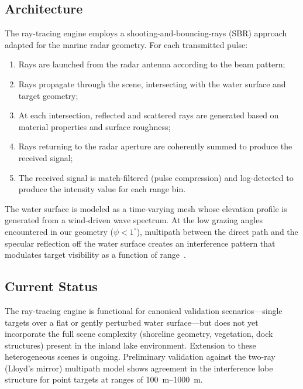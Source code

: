 \documentclass[twocolumn, 10pt]{article}
\begin{document}
\subsection{Architecture}

The ray-tracing engine employs a shooting-and-bouncing-rays (SBR) approach~\cite{ling1989shooting} adapted for the marine radar geometry. For each transmitted pulse:
\begin{enumerate}
    \item Rays are launched from the radar antenna according to the beam pattern;
    \item Rays propagate through the scene, intersecting with the water surface and target geometry;
    \item At each intersection, reflected and scattered rays are generated based on material properties and surface roughness;
    \item Rays returning to the radar aperture are coherently summed to produce the received signal;
    \item The received signal is match-filtered (pulse compression) and log-detected to produce the intensity value for each range bin.
\end{enumerate}

The water surface is modeled as a time-varying mesh whose elevation profile is generated from a wind-driven wave spectrum. At the low grazing angles encountered in our geometry ($\psi < 1^{\circ}$), multipath between the direct path and the specular reflection off the water surface creates an interference pattern that modulates target visibility as a function of range~\cite{long2001radar, blake1986radar}.

\subsection{Current Status}

The ray-tracing engine is functional for canonical validation scenarios---single targets over a flat or gently perturbed water surface---but does not yet incorporate the full scene complexity (shoreline geometry, vegetation, dock structures) present in the inland lake environment. Extension to these heterogeneous scenes is ongoing. Preliminary validation against the two-ray (Lloyd's mirror) multipath model shows agreement in the interference lobe structure for point targets at ranges of \SIrange{100}{1000}{\meter}.

\end{document}
